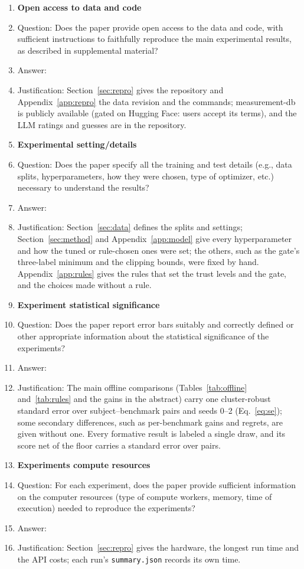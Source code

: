 \begin{enumerate}
\item {\bf Open access to data and code}
  \item[] Question: Does the paper provide open access to the data and code, with sufficient instructions to faithfully reproduce the main experimental results, as described in supplemental material?
  \item[] Answer: \answerYes{}
  \item[] Justification: Section~\ref{sec:repro} gives the repository and Appendix~\ref{app:repro} the data revision and the commands; measurement-db is publicly available (gated on Hugging Face: users accept its terms), and the LLM ratings and guesses are in the repository.

\item {\bf Experimental setting/details}
  \item[] Question: Does the paper specify all the training and test details (e.g., data splits, hyperparameters, how they were chosen, type of optimizer, etc.) necessary to understand the results?
  \item[] Answer: \answerYes{}
  \item[] Justification: Section~\ref{sec:data} defines the splits and settings; Section~\ref{sec:method} and Appendix~\ref{app:model} give every hyperparameter and how the tuned or rule-chosen ones were set; the others, such as the gate's three-label minimum and the clipping bounds, were fixed by hand. Appendix~\ref{app:rules} gives the rules that set the trust levels and the gate, and the choices made without a rule.

\item {\bf Experiment statistical significance}
  \item[] Question: Does the paper report error bars suitably and correctly defined or other appropriate information about the statistical significance of the experiments?
  \item[] Answer: \answerYes{}
  \item[] Justification: The main offline comparisons (Tables~\ref{tab:offline} and~\ref{tab:rules} and the gains in the abstract) carry one cluster-robust standard error over subject--benchmark pairs and seeds 0--2 (Eq.~\eqref{eq:se}); some secondary differences, such as per-benchmark gains and regrets, are given without one. Every formative result is labeled a single draw, and its score net of the floor carries a standard error over pairs.

\item {\bf Experiments compute resources}
  \item[] Question: For each experiment, does the paper provide sufficient information on the computer resources (type of compute workers, memory, time of execution) needed to reproduce the experiments?
  \item[] Answer: \answerYes{}
  \item[] Justification: Section~\ref{sec:repro} gives the hardware, the longest run time and the API costs; each run's \texttt{summary.json} records its own time.


\end{enumerate}
